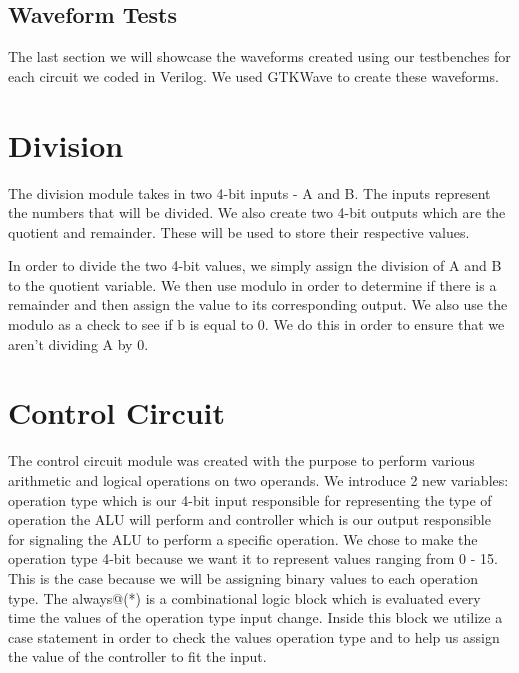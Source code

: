 \documentclass[12pt]{article}
\begin{document}
\subsection{Waveform Tests}

The last section we will showcase the waveforms created using our testbenches for each circuit we coded in Verilog. We used GTKWave to create these waveforms.







\section{Division}
The division module takes in two 4-bit inputs - A and B. The inputs represent the numbers that will be divided. We also create two 4-bit outputs which are the quotient and remainder. These will be used to store their respective values.


In order to divide the two 4-bit values, we simply assign the division of A and B to the quotient variable. We then use modulo in order to determine if there is a remainder and then assign the value to its corresponding output. We also use the modulo as a check to see if b is equal to 0. We do this in order to ensure that we aren't dividing A by 0.





\section{Control Circuit}
The control circuit module was created with the purpose to perform various arithmetic and logical operations on two operands. We introduce 2 new variables: operation type which is our 4-bit input responsible for representing the type of operation the ALU will perform and controller which is our output responsible for signaling the ALU to perform a specific operation. We chose to make the operation type 4-bit because we want it to represent values ranging from 0 - 15. This is the case because we will be assigning binary values to each operation type. The always@(*) is a combinational logic block which is evaluated every time the values of the operation type input change. Inside this block we utilize a case statement in order to check the values operation type and to help us assign the value of the controller to fit the input. 
\end{document}
